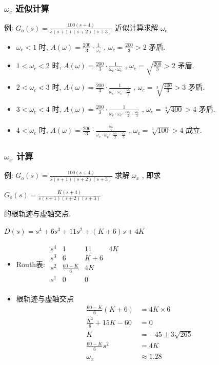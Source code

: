 \documentclass[table]{beamer}
\begin{document}
\begin{frame}
\frametitle{$\omega_c$ 近似计算}
\label{sec-5-1-4}

  例: $G_o(s)=\frac{100(s+4)}{s(s+1)(s+2)(s+3)}$ 近似计算求解 $\omega_c$ 
\begin{itemize}
\item <3->$\omega_c<1$   时, $A(\omega)=\frac{200}{3}\cdot\frac{1}{\omega_c}$ , $\omega_c=\frac{200}{3}>2$ 矛盾.
\item <4->$1<\omega_c<2$ 时, $A(\omega)=\frac{200}{3}\cdot\frac{1}{\omega_c\cdot\omega_c}$ , $\omega_c=\sqrt{\frac{200}{3}}>2$ 矛盾.
\item <5->$2<\omega_c<3$ 时, $A(\omega)=\frac{200}{3}\cdot\frac{1}{\omega_c\cdot\omega_c\cdots\frac{\omega_c}{2}}$ , $\omega_c=\sqrt[3]{\frac{400}{3}}>3$ 矛盾.
\item <6->$3<\omega_c<4$ 时, $A(\omega)=\frac{200}{3}\cdot\frac{1}{\omega_c\cdot\omega_c\cdots\frac{\omega_c}{2}\cdots\frac{\omega_c}{3}}$ , $\omega_c=\sqrt[4]{400}>4$ 矛盾.
\item <7->$4<\omega_c$ 时, $A(\omega)=\frac{200}{3}\cdot\frac{\frac{\omega_c}{4}}{\omega_c\cdot\omega_c\cdots\frac{\omega_c}{2}\cdots\frac{\omega_c}{3}}$ , $\omega_c=\sqrt[3]{100}>4$ 成立.
\end{itemize}
\end{frame}
\begin{frame}
\frametitle{$\omega_x$ 计算}
\label{sec-5-1-5}

 例: $G_o(s)=\frac{100(s+4)}{s(s+1)(s+2)(s+3)}$ 求解 $\omega_x$ , 即求 

$G_o(s)=\frac{K(s+4)}{s(s+1)(s+2)(s+3)}$ 

的根轨迹与虚轴交点.

$D(s)=s^4+6s^3+11s^2+(K+6)s+4K$
\begin{itemize}

\item Routh表:
\label{sec-5-1-5-1}%
\begin{math}
\begin{matrix}
s^4 & 1  & 11     & 4K \\
s^3 & 6  & K+6  \\
s^2 & \frac{60-K}{6} & 4K \\
s^1 & 0 & 0 \\
\end{matrix}
\end{math}


\item 根轨迹与虚轴交点
\label{sec-5-1-5-2}%
\begin{align*}
\frac{60-K}{6}(K+6) &=4K\times 6 \\
\frac{K^2}{6}+15K-60 &=0\\
K&=-45\pm 3\sqrt{265}\\
\frac{60-K}{6}s^2 &= 4K\\
\omega_x &\approx 1.28
\end{align*}
\end{itemize} %
\end{frame}
\end{document}
